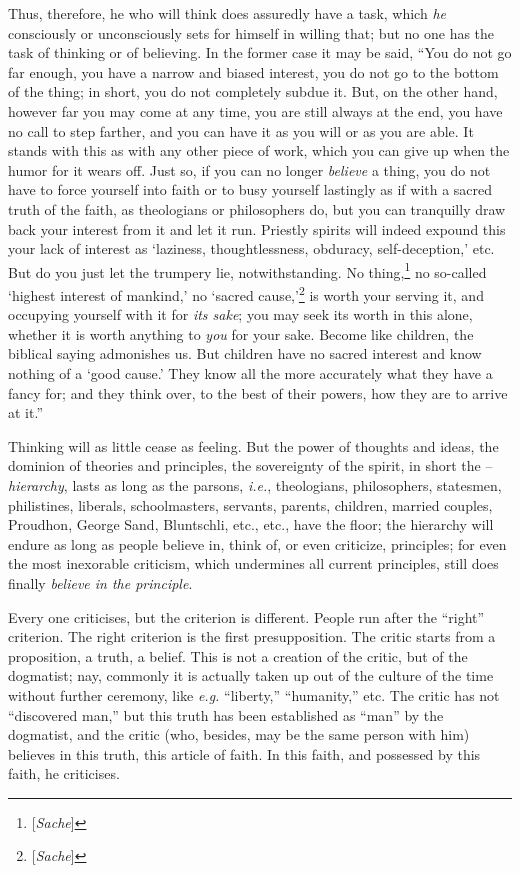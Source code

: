 Thus, therefore, he who will think does assuredly have a task, which 
\textit{he} consciously or unconsciously sets for himself in willing that; but 
no one has the task of thinking or of believing. In the former case it may be 
said, ``You do not go far enough, you have a narrow and biased interest, you 
do not go to the bottom of the thing; in short, you do not completely subdue 
it. But, on the other hand, however far you may come at any time, you are 
still always at the end, you have no call to step farther, and you can have it 
as you will or as you are able. It stands with this as with any other piece of 
work, which you can give up when the humor for it wears off. Just so, if you 
can no longer \textit{believe} a thing, you do not have to force yourself into 
faith or to busy yourself lastingly as if with a sacred truth of the faith, as 
theologians or philosophers do, but you can tranquilly draw back your interest 
from it and let it run. Priestly spirits will indeed expound this your lack of 
interest as `laziness, thoughtlessness, obduracy, self-deception,' etc. 
But do you just let the trumpery lie, notwithstanding. No 
thing,\footnote{[\textit{Sache}]} no so-called `highest interest of 
mankind,' no `sacred cause,'\footnote{[\textit{Sache}]} is worth your 
serving it, and occupying yourself with it for \textit{its sake}; you may seek 
its worth in this alone, whether it is worth anything to \textit{you} for your 
sake. Become like children, the biblical saying admonishes us. But children 
have no sacred interest and know nothing of a `good cause.' They know all 
the more accurately what they have a fancy for; and they think over, to the 
best of their powers, how they are to arrive at it.''

Thinking will as little cease as feeling. But the power of thoughts and ideas, 
the dominion of theories and principles, the sovereignty of the spirit, in 
short the -- \textit{hierarchy}, lasts as long as the parsons, \textit{i.e.}, 
theologians, philosophers, statesmen, philistines, liberals, schoolmasters, 
servants, parents, children, married couples, Proudhon, George Sand, 
Bluntschli, etc., etc., have the floor; the hierarchy will endure as long as 
people believe in, think of, or even criticize, principles; for even the most 
inexorable criticism, which undermines all current principles, still does 
finally \textit{believe in the principle}.

Every one criticises, but the criterion is different. People run after the 
``right'' criterion. The right criterion is the first presupposition. The 
critic starts from a proposition, a truth, a belief. This is not a creation of 
the critic, but of the dogmatist; nay, commonly it is actually taken up out of 
the culture of the time without further ceremony, like \textit{e.g.} 
``liberty,'' ``humanity,'' etc. The critic has not ``discovered man,'' 
but this truth has been established as ``man'' by the dogmatist, and the 
critic (who, besides, may be the same person with him) believes in this truth, 
this article of faith. In this faith, and possessed by this faith, he 
criticises.

